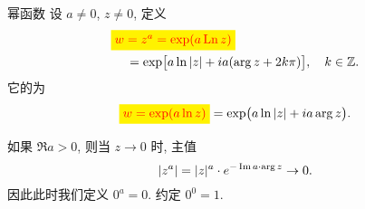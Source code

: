 %
%


\begin{frame}{幂函数}
\onslide<+->
设 $a\neq 0$, $z\neq 0$, 定义
\begin{align*}
&\boxatt{$w=z^a=\exp(a\Ln z)$}\\
&\hspace{12pt}=\exp\bigl[a\ln|z|+ia(\arg z+2k\pi)\bigr],\quad k\in\BZ.
\end{align*}
\onslide<+->
它的为
\[\boxatt{$w=\exp(a\ln z)$}=\exp\bigl(a\ln|z|+ia\arg z\bigr).\]

\onslide<+->
如果 $\Re a>0$, 则当 $z\to 0$ 时, 主值
\[\left|z^a\right|=|z|^a\cdot e^{-\operatorname{Im} a\cdot\arg z}\to 0.\]
\onslide<+->
因此此时我们定义 $0^a=0$.
\onslide<+->
约定 $0^0=1$.
\end{frame}


